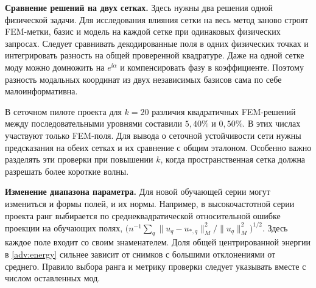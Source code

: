 \textbf{Сравнение решений на двух сетках.}
Здесь нужны два решения одной физической задачи. Для исследования влияния
сетки на весь метод заново строят FEM-метки, базис и модель на каждой
сетке при одинаковых физических запросах. Следует сравнивать декодированные
поля в одних физических точках и интегрировать разность на общей
проверенной квадратуре. Даже на одной сетке моду можно домножить на
$e^{\ii\alpha}$ и компенсировать фазу в коэффициенте. Поэтому разность
модальных координат из двух независимых базисов сама по себе малоинформативна.

В сеточном пилоте проекта для $k=20$ различия квадратичных FEM-решений
между последовательными уровнями составили $5{,}40\%$ и $0{,}50\%$.
В этих числах участвуют только FEM-поля. Для вывода о сеточной
устойчивости сети нужны предсказания на обеих сетках и их сравнение
с общим эталоном. Особенно важно разделять эти проверки при повышении
$k$, когда пространственная сетка должна разрешать более короткие волны.

\textbf{Изменение диапазона параметра.}
Для новой обучающей серии могут измениться и формы полей, и их нормы.
Например, в высокочастотной серии проекта ранг выбирается по
среднеквадратической относительной ошибке проекции на обучающих полях,
$\big(n^{-1}\sum_q \|u_q-u_{*,q}\|_M^2/\|u_q\|_M^2\big)^{1/2}$.
Здесь каждое поле входит со своим знаменателем. Доля общей
центрированной энергии в \eqref{adv:energy} сильнее зависит от снимков
с большими отклонениями от среднего. Правило выбора ранга и метрику
проверки следует указывать вместе с числом оставленных мод.
